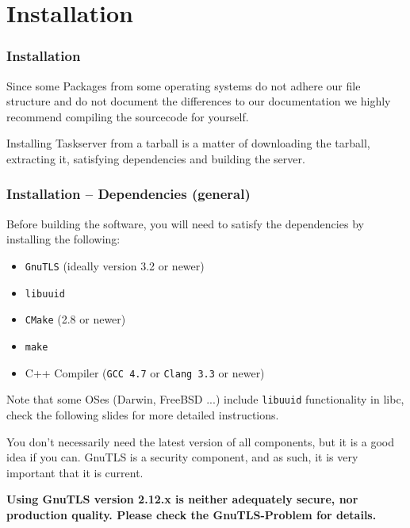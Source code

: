 \documentclass[t,handout]{beamer}
\begin{document}
\section{Installation}

\begin{frame}[fragile]\frametitle{Installation}
    \vfill
    Since some Packages from some operating systems do not adhere our file structure and do not document the differences to our documentation we highly recommend compiling the sourcecode for yourself.

    Installing Taskserver from a tarball is a matter of downloading the tarball, extracting it, satisfying dependencies and building the server.
\end{frame}

\begin{frame}[fragile]\frametitle{Installation -- Dependencies (general)}
    Before building the software, you will need to satisfy the dependencies by installing the following:

    \begin{itemize}
        \item \verb+GnuTLS+ (ideally version 3.2 or newer)
        \item \verb+libuuid+
        \item \verb+CMake+ (2.8 or newer)
        \item \verb+make+
        \item C++ Compiler (\verb+GCC 4.7+ or \verb+Clang 3.3+ or newer)
    \end{itemize}

    Note that some OSes (Darwin, FreeBSD ...) include \verb+libuuid+ functionality in libc, check the following slides for more detailed instructions.

    You don't necessarily need the latest version of all components, but it is a good idea if you can.  GnuTLS is a security component, and as such, it is very important that it is current.

    \textbf{Using GnuTLS version 2.12.x is neither adequately secure, nor production quality. Please check the GnuTLS-Problem for details.}
\end{frame}
\end{document}
